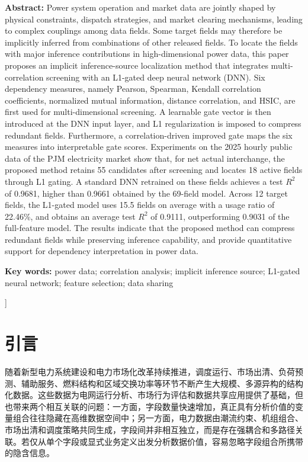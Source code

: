 \documentclass[UTF8,zihao=5,twoside]{ctexart}
\numberwithin{equation}{section}
\newcommand{\fundcn}{基金项目：无。}
\newcommand{\funden}{Foundation item: None.}
\begin{document}
\noindent\textbf{Abstract:} Power system operation and market data are jointly shaped by physical constraints, dispatch strategies, and market clearing mechanisms, leading to complex couplings among data fields. Some target fields may therefore be implicitly inferred from combinations of other released fields. To locate the fields with major inference contributions in high-dimensional power data, this paper proposes an implicit inference-source localization method that integrates multi-correlation screening with an L1-gated deep neural network (DNN). Six dependency measures, namely Pearson, Spearman, Kendall correlation coefficients, normalized mutual information, distance correlation, and HSIC, are first used for multi-dimensional screening. A learnable gate vector is then introduced at the DNN input layer, and L1 regularization is imposed to compress redundant fields. Furthermore, a correlation-driven improved gate maps the six measures into interpretable gate scores. Experiments on the 2025 hourly public data of the PJM electricity market show that, for net actual interchange, the proposed method retains 55 candidates after screening and locates 18 active fields through L1 gating. A standard DNN retrained on these fields achieves a test $R^2$ of 0.9681, higher than 0.9661 obtained by the 69-field model. Across 12 target fields, the L1-gated model uses 15.5 fields on average with a usage ratio of 22.46\%, and obtains an average test $R^2$ of 0.9111, outperforming 0.9031 of the full-feature model. The results indicate that the proposed method can compress redundant fields while preserving inference capability, and provide quantitative support for dependency interpretation in power data.\par
\noindent\textbf{Key words:} power data; correlation analysis; implicit inference source; L1-gated neural network; feature selection; data sharing\par\vspace{0.8em}

\noindent{\small\fundcn\\\funden}
\vspace{0.8em}
]

\section{引言}
随着新型电力系统建设和电力市场化改革持续推进，调度运行、市场出清、负荷预测、辅助服务、燃料结构和区域交换功率等环节不断产生大规模、多源异构的结构化数据\cite{ref-liu-cps,ref-ma-pjm,ref-fan-pjm}。这些数据为电网运行分析、市场行为评估和数据共享应用提供了基础\cite{ref-zhu-sharing}，但也带来两个相互关联的问题：一方面，字段数量快速增加，真正具有分析价值的变量组合往往隐藏在高维数据空间中；另一方面，电力数据由潮流约束、机组组合、市场出清和调度策略共同生成，字段间并非相互独立，而是存在强耦合和多路径关联。若仅从单个字段或显式业务定义出发分析数据价值，容易忽略字段组合所携带的隐含信息。
\end{document}
